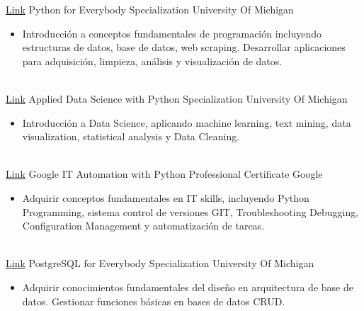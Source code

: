 \documentclass[letterpaper]{DS_class_file} %
\begin{document}
\begin{twenty} %
	\twentyitem
	{\href{https://www.coursera.org/specializations/python?page=7}{Link}}
	{}
	{\hspace{0.1cm}Python for Everybody Specialization}
	{University Of Michigan}
	{}
	{
		{\begin{itemize}
				\item Introducción a conceptos fundamentales de programación incluyendo estructuras de datos, base de datos, web scraping. Desarrollar aplicaciones para adquisición, limpieza, análisis y visualización de datos.
		\end{itemize}}
	}
	\\
	\twentyitem
	{\href{https://www.coursera.org/specializations/data-science-python}{Link}}
	{}
	{\hspace{0.1cm}Applied Data Science with Python Specialization}
	{University Of Michigan}
	{}
	{
		{\begin{itemize}
				\item Introducción a Data Science, aplicando machine learning, text mining, data visualization, statistical analysis  y Data Cleaning.
		\end{itemize}}
	}
	\\
	\twentyitem
	{\href{https://www.coursera.org/professional-certificates/google-it-automation}{Link}}
	{}
	{\hspace{0.1cm}Google IT Automation with Python Professional Certificate}
	{Google }
	{}
	{
		{\begin{itemize}
				\item Adquirir conceptos fundamentales en IT skills, incluyendo Python Programming, sistema control de versiones GIT, Troubleshooting  Debugging, Configuration Management  y automatización de tareas.
		\end{itemize}}
	}
	\\
	\twentyitem
	{\href{https://www.coursera.org/specializations/postgresql-for-everybody}{Link}}
	{}
	{\hspace{0.1cm}PostgreSQL for Everybody Specialization}
	{University Of Michigan}
	{}
	{
		{\begin{itemize}
				\item Adquirir conocimientos fundamentales del diseño en arquitectura de base de datos. Gestionar funciones básicas en bases de datos CRUD.
		\end{itemize}}
}
\end{twenty}
\end{document}
